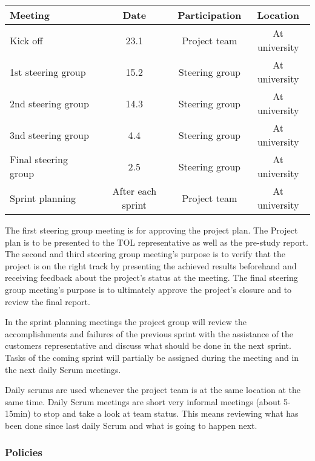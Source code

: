 \documentclass[12pt,titlepage,a4paper]{article}
\begin{document}
		\begin{center}
		\begin{tabular}{|l|c|c|c|}
			\hline
			\textbf{Meeting} & \textbf{Date} & \textbf{Participation} & \textbf{Location} \\
			\hline
			\hline
			Kick off & 23.1 & Project team & At university \\
			\hline
			1st steering group & 15.2 & Steering group & At university \\
			\hline
			2nd steering group & 14.3 & Steering group & At university \\
			\hline
			3nd steering group & 4.4 & Steering group & At university \\
			\hline
			Final steering group & 2.5 & Steering group & At university \\
			\hline
			Sprint planning & After each sprint & Project team & At university \\
			\hline
		\end{tabular}
		\end{center}	
 
		The first steering group meeting is for approving the project plan. The Project plan is to be presented to the TOL 				representative as well as the pre-study report.
		The second and third steering group meeting's purpose is to verify that the project is on the right track by presenting the 		achieved results beforehand and receiving feedback about the project's status at the meeting.
		The final steering group meeting's purpose is to ultimately approve the project's closure and to review the final report.
 
		In the sprint planning meetings the project group will review the accomplishments and failures of the previous sprint with 		the assistance of the customers representative and discuss what should be done in the next sprint. Tasks of the coming 		sprint will partially be assigned during the meeting and in the next daily Scrum meetings.
		
		Daily scrums are used whenever the project team is at the same location at the same time. Daily Scrum meetings are 			short very informal meetings (about 5-15min) to stop and take a look at team status. This means reviewing what has 			been done since last daily Scrum and what is going to happen next.
		
		
 
	\subsubsection{Policies}
 
\end{document}
